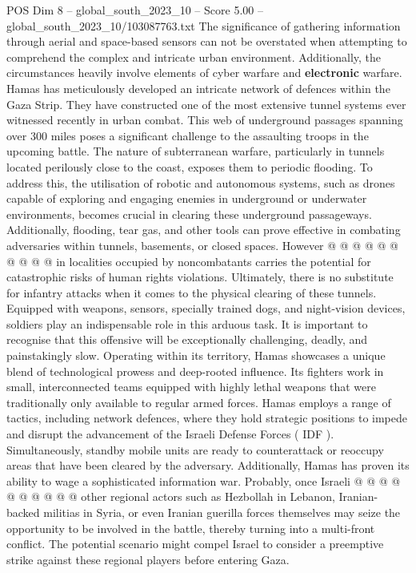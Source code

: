 \begin{textsample}{POS Dim 8 – global\_south\_2023\_10 – Score 5.00 – global\_south\_2023\_10/103087763.txt}
The significance of gathering information through aerial and space-based sensors can not be overstated when attempting to comprehend the complex and intricate urban environment.
Additionally, the circumstances heavily involve elements of cyber warfare and \textbf{electronic} warfare.
Hamas has meticulously developed an intricate network of defences within the Gaza Strip.
They have constructed one of the most extensive tunnel systems ever witnessed recently in urban combat.
This web of underground passages spanning over 300 miles poses a significant challenge to the assaulting troops in the upcoming battle.
The nature of subterranean warfare, particularly in tunnels located perilously close to the coast, exposes them to periodic flooding.
To address this, the utilisation of robotic and autonomous systems, such as drones capable of exploring and engaging enemies in underground or underwater environments, becomes crucial in clearing these underground passageways.
Additionally, flooding, tear gas, and other tools can prove effective in combating adversaries within tunnels, basements, or closed spaces.
However @ @ @ @ @ @ @ @ @ @ in localities occupied by noncombatants carries the potential for catastrophic risks of human rights violations.
Ultimately, there is no substitute for infantry attacks when it comes to the physical clearing of these tunnels.
Equipped with weapons, sensors, specially trained dogs, and night-vision devices, soldiers play an indispensable role in this arduous task.
It is important to recognise that this offensive will be exceptionally challenging, deadly, and painstakingly slow.
Operating within its territory, Hamas showcases a unique blend of technological prowess and deep-rooted influence.
Its fighters work in small, interconnected teams equipped with highly lethal weapons that were traditionally only available to regular armed forces.
Hamas employs a range of tactics, including network defences, where they hold strategic positions to impede and disrupt the advancement of the Israeli Defense Forces ( IDF ).
Simultaneously, standby mobile units are ready to counterattack or reoccupy areas that have been cleared by the adversary.
Additionally, Hamas has proven its ability to wage a sophisticated information war.
Probably, once Israeli @ @ @ @ @ @ @ @ @ @ other regional actors such as Hezbollah in Lebanon, Iranian-backed militias in Syria, or even Iranian guerilla forces themselves may seize the opportunity to be involved in the battle, thereby turning into a multi-front conflict.
The potential scenario might compel Israel to consider a preemptive strike against these regional players before entering Gaza.

\end{textsample}
